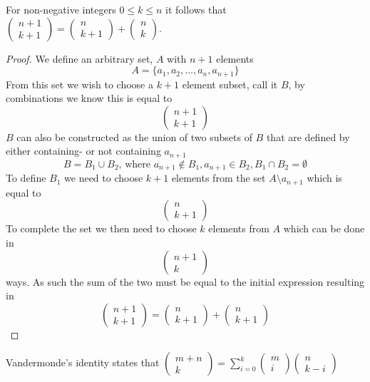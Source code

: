 \begin{theorem}
    For non-negative integers $0\leq k\leq n$ it follows that $\begin{pmatrix}n+1\\k+1\end{pmatrix}=\begin{pmatrix}n\\k+1\end{pmatrix}+\begin{pmatrix}n\\k\end{pmatrix}$.
\end{theorem}
\begin{proof}
  We define an arbitrary set, $A$ with $n+1$ elements
  \[
      A=\{a_{1},a_{2},\ldots,a_{n},a_{n+1}\}
  \]
  From this set we wish to choose a $k+1$ element subset, call it $B$, by combinations we know this is equal to
  \[
      \begin{pmatrix}n+1\\k+1\end{pmatrix}
  \]
  $B$ can also be constructed as the union of two subsets of $B$ that are defined by either containing- or not containing $a_{n+1}$
  \[
      B=B_{1}\cup B_{2}\text{, where } a_{n+1}\notin B_{1},a_{n+1}\in B_{2},B_{1}\cap B_{2}=\emptyset
  \]
  To define $B_{1}$ we need to choose $k+1$ elements from the set $A\setminus a_{n+1}$ which is equal to
  \[
      \begin{pmatrix}n\\k+1\end{pmatrix}
  \]
  To complete the set we then need to choose $k$ elements from $A$ which can be done in
  \[
      \begin{pmatrix}n+1\\k\end{pmatrix}
  \]
  ways. As such the sum of the two must be equal to the initial expression resulting in
  \[
      \begin{pmatrix}n+1\\k+1\end{pmatrix}=\begin{pmatrix}n\\k+1\end{pmatrix}+\begin{pmatrix}n\\k+1\end{pmatrix}
  \]
\end{proof}
\begin{theorem}
    Vandermonde's identity states that $\begin{pmatrix}m+n\\k\end{pmatrix}=\sum_{i=0}^{k}\begin{pmatrix}m\\i\end{pmatrix}\begin{pmatrix}n\\k-i\end{pmatrix}$
\end{theorem}
